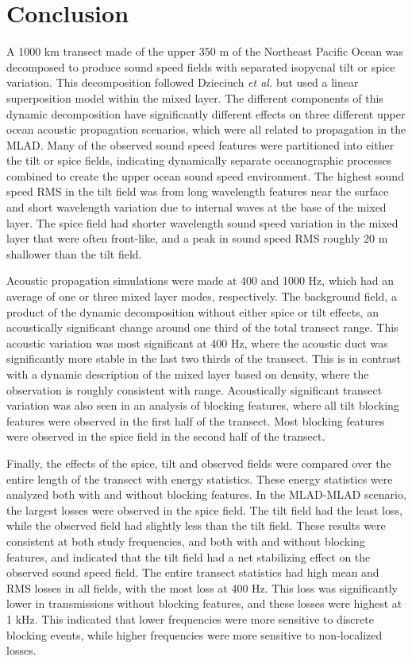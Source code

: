 \documentclass[preprint,NumberedRefs]{JASA}
\begin{document}
\section{Conclusion}\label{sec:conclusion}
A 1000 km transect made of the upper 350 m of the Northeast Pacific Ocean was decomposed to produce sound speed fields with separated isopycnal tilt or spice variation. This decomposition followed Dzieciuch \emph{et al.}\citep{dzieciuch2004} but used a linear superposition model within the mixed layer. The different components of this dynamic decomposition have significantly different effects on three different upper ocean acoustic propagation scenarios, which were all related to propagation in the MLAD. Many of the observed sound speed features were partitioned into either the tilt or spice fields, indicating dynamically separate oceanographic processes combined to create the upper ocean sound speed environment. The highest sound speed RMS in the tilt field was from long wavelength features near the surface and short wavelength variation due to internal waves at the base of the mixed layer. The spice field had shorter wavelength sound speed variation in the mixed layer that were often front-like, and a peak in sound speed RMS roughly 20 m shallower than the tilt field.

Acoustic propagation simulations were made at 400 and 1000 Hz, which had an average of one or three mixed layer modes, respectively. The background field, a product of the dynamic decomposition without either spice or tilt effects, an acoustically significant change around one third of the total transect range. This acoustic variation was most significant at 400 Hz, where the acoustic duct was significantly more stable in the last two thirds of the transect. This is in contrast with a dynamic description of the mixed layer based on density\citep{cole2010seasonal}, where the observation is roughly consistent with range. Acoustically significant transect variation was also seen in an analysis of blocking features, where all tilt blocking features were observed in the first half of the transect. Most blocking features were observed in the spice field in the second half of the transect.

Finally, the effects of the spice, tilt and observed fields were compared over the entire length of the transect with energy statistics. These energy statistics were analyzed both with and without blocking features. In the MLAD-MLAD scenario, the largest losses were observed in the spice field. The tilt field had the least loss, while the observed field had slightly less than the tilt field. These results were consistent at both study frequencies, and both with and without blocking features, and indicated that the tilt field had a net stabilizing effect on the observed sound speed field. The entire transect statistics had high mean and RMS losses in all fields, with the most loss at 400 Hz. This loss was significantly lower in transmissions without blocking features, and these losses were highest at 1 kHz. This indicated that lower frequencies were more sensitive to discrete blocking events, while higher frequencies were more sensitive to non-localized losses.
\end{document}
